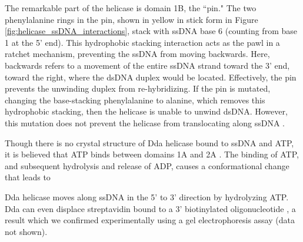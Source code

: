 The remarkable part of the helicase is domain 1B, the ``pin."  The two phenylalanine rings in the pin, shown in yellow in stick form in Figure \ref{fig:helicase_ssDNA_interactions}, stack with ssDNA base 6 (counting from base 1 at the 5' end).  This hydrophobic stacking interaction acts as the pawl in a ratchet mechanism, preventing the ssDNA from moving backwards.  Here, backwards refers to a movement of the entire ssDNA strand toward the 3' end, toward the right, where the dsDNA duplex would be located.  Effectively, the pin prevents the unwinding duplex from re-hybridizing.  If the pin is mutated, changing the base-stacking phenylalanine to alanine, which removes this hydrophobic stacking, then the helicase is unable to unwind dsDNA.  However, this mutation does not prevent the helicase from translocating along ssDNA \citep{He2012}.

Though there is no crystal structure of Dda helicase bound to ssDNA and ATP, it is believed that ATP binds between domains 1A and 2A \citep{He2012}.  The binding of ATP, and subsequent hydrolysis and release of ADP, causes a conformational change that leads to 

Dda helicase moves along ssDNA in the 5' to 3' direction by hydrolyzing ATP.  Dda can even displace streptavidin bound to a 3' biotinylated oligonucleotide \citep{Morris1999}, a result which we confirmed experimentally using a gel electrophoresis assay (data not shown). %


